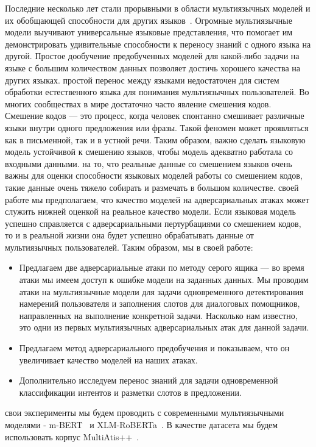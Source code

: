 Последние несколько лет стали прорывными в области мультиязычных моделей и их обобщающей способности для других языков~\cite{Liu2020WhatMM,Wu2019BetoBB}.
Огромные мультиязычные модели выучивают универсальные языковые представления, что помогает им демонстрировать удивительные способности к переносу знаний с одного языка на другой.
Простое дообучение предобученных моделей для какой-либо задачи на языке с большим количеством данных позволяет достичь хорошего качества на других языках.
 простой перенос между языками недостаточен для систем обработки естественного языка для понимания мультиязычных пользователей.
Во многих сообществах в мире достаточно часто явление смешения кодов.
Смешение кодов — это процесс, когда человек спонтанно смешивает различные языки внутри одного предложения или фразы.
Такой феномен может проявляться как в письменной, так и в устной речи.
Таким образом, важно сделать языковую модель устойчивой к смешению языков, чтобы модель адекватно работала со входными данными.
 на то, что реальные данные со смешением языков очень важны для оценки способности языковых моделей работы со смешением кодов, такие данные очень тяжело собирать и размечать в большом количестве.
 своей работе мы предполагаем, что качество моделей на адверсариальных атаках может служить нижней оценкой на реальное качество модели.
Если языковая модель успешно справляется с адверсариальными пертурбациями со смешением кодов, то и в реальной жизни она будет успешно обрабатывать данные от мультиязычных пользователей.
Таким образом, мы в своей работе:
\begin{itemize}
    \item Предлагаем две адверсариальные атаки по методу серого ящика — во время атаки мы имеем доступ к ошибке модели на заданных данных.
    Мы проводим атаки на мультиязычные модели для задачи одновременного детектирования намерений пользователя и заполнения слотов для диалоговых помощников, направленных на выполнение конкретной задачи.
    Насколько нам известно, это одни из первых мультиязычных адверсариальных атак для данной задачи.
    \item Предлагаем метод адверсариального предобучения и показываем, что он увеличивает качество моделей на наших атаках.
    \item Дополнительно исследуем перенос знаний для задачи одновременной классификации интентов и разметки слотов в предложении.
\end{itemize}
 свои эксперименты мы будем проводить с современными мультиязычными моделями - m-BERT~\cite{devlin-etal-2019-bert} и XLM-RoBERTa~\cite{Conneau2020UnsupervisedCR}.
В качестве датасета мы будем использовать корпус MultiAtis++~\cite{Xu2020EndtoEndSA}.
